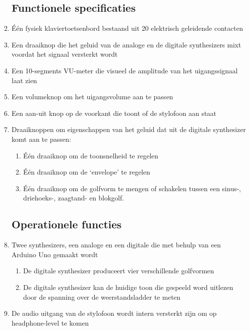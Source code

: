 \documentclass[12pt, a4paper, dutch]{article}
\begin{document}
\begin{enumerate}
\subsection{Functionele specificaties}
	\item \label{req:20keys} \'E\'en fysiek klaviertoetsenbord bestaand uit 20
		elektrisch geleidende contacten
	\item \label{req:mixfader} Een draaiknop die het geluid van de analoge en de
		digitale synthesizers mixt voordat het signaal versterkt wordt
	\item \label{req:vumeter} Een 10-segments VU-meter die visueel de amplitude van het
		uigangssignaal laat zien
	\item \label{req:volknob} Een volumeknop om het uigangsvolume aan te passen
	\item \label{req:powerbutton} Een aan-uit knop op de voorkant die toont of de stylofoon
		aan staat
	\item \label{req:digsoundtweak} Draaiknoppen om eigenschappen van het geluid dat
		uit de digitale synthesizer komt aan te passen:
	\begin{enumerate}
		\item \label{req:toonsnelheid} \'E\'en draaiknop om de toonsnelheid te regelen
		\item \label{req:env} \'E\'en draaiknop om de `envelope' te regelen
		\item \label{req:wavform} \'E\'en draaiknop om de golfvorm te mengen of schakelen
			tussen een sinus-, driehoeks-, zaagtand- en blokgolf.
	\end{enumerate}
\subsection{Operationele functies}
	\item \label{req:engines} Twee synthesizers, een analoge en een digitale die met
		behulp van een Arduino Uno gemaakt wordt
	\begin{enumerate}
		\item \label{req:wavforms} De digitale synthesizer produceert vier verschillende
			golfvormen
		\item \label{req:readtone} De digitale synthesizer kan de huidige toon die
			gespeeld word uitlezen door de spanning over de weerstandsladder te meten
	\end{enumerate}
	\item \label{req:phonesout} De audio uitgang van de stylofoon wordt intern
		versterkt zijn om op headphone-level te komen

\end{enumerate}
\end{document}
